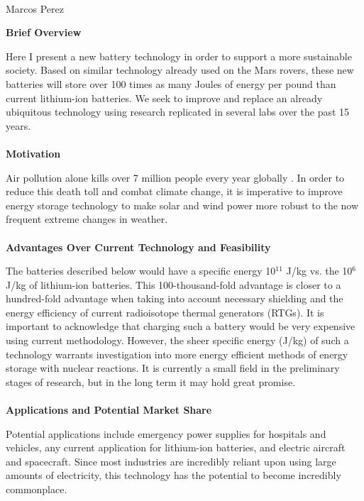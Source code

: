 \documentclass[12pt]{article}
\begin{document}
\begin{center}
   \\
   Marcos Perez
\end{center}
\begin{comment}
    What do I want them to walk away with? \\
    Nuclear reactions 
\end{comment}
\textbf{Brief Overview}\par
Here I present a new battery technology in order to support a more sustainable society. Based on similar technology already used on the Mars rovers, these new batteries will store over 100 times as many Joules of energy per pound than current lithium-ion batteries. We seek to improve and replace an already ubiquitous technology using research replicated in several labs over the past 15 years. 
\\ \\ \textbf{Motivation}\par
Air pollution alone kills over 7 million people every year globally \cite{mannucci_novel_2019, noauthor_compendium_nodate, nansai_consumption_2021}. 
In order to reduce this death toll and combat climate change, it is imperative to improve energy storage technology to make solar and wind power more robust to the now frequent extreme changes in weather.
\\ \\ \textbf{Advantages Over Current Technology and Feasibility}\par
The batteries described below would have a specific energy 10$^{11}$ J/kg vs. the 10$^6$ J/kg of lithium-ion batteries. This 100-thousand-fold advantage is closer to a hundred-fold advantage when taking into account necessary shielding and the energy efficiency of current radioisotope thermal generators (RTGs). It is important to acknowledge that charging such a battery would be very expensive using current methodology. However, the sheer specific energy (J/kg) of such a technology warrants investigation into more energy efficient methods of energy storage with nuclear reactions. It is currently a small field in the preliminary stages of research, but in the long term it may hold great promise.
\\ \\ \textbf{Applications and Potential Market Share}\par 
Potential applications include emergency power supplies for hospitals and vehicles, any current application for lithium-ion batteries, and electric aircraft and spacecraft. Since most industries are incredibly reliant upon using large amounts of electricity, this technology has the potential to become incredibly commonplace.
\end{document}
